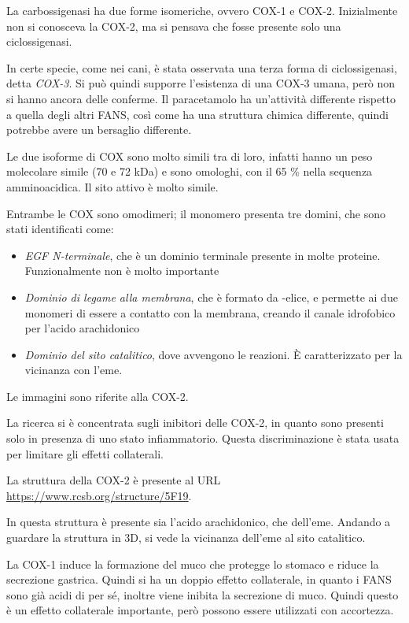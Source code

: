 La carbossigenasi ha due forme isomeriche, ovvero COX-1 e COX-2.
Inizialmente non si conosceva la COX-2, ma si pensava che fosse presente
solo una ciclossigenasi.

In certe specie, come nei cani, è stata osservata una terza forma di
ciclossigenasi, detta \emph{COX-3}. Si può quindi supporre l'esistenza
di una COX-3 umana, però non si hanno ancora delle conferme. Il
paracetamolo ha un'attività differente rispetto a quella degli altri
FANS, così come ha una struttura chimica differente, quindi potrebbe
avere un bersaglio differente.

Le due isoforme di COX sono molto simili tra di loro, infatti hanno un
peso molecolare simile (70 e 72 kDa) e sono omologhi, con il 65 \% nella
sequenza amminoacidica. Il sito attivo è molto simile.

Entrambe le COX sono omodimeri; il monomero presenta tre domini, che
sono stati identificati come:
\begin{itemize}
\item
\emph{EGF N-terminale}, che è un dominio
terminale presente in molte proteine. Funzionalmente non è molto importante
\item
\emph{Dominio di legame alla membrana}, che è formato da \alpha-elice, e permette ai due monomeri di essere a contatto con la membrana, creando il canale idrofobico per l'acido arachidonico
\item
\emph{Dominio del sito catalitico}, dove avvengono le reazioni. È caratterizzato per la vicinanza con l'eme.
\end{itemize}


Le immagini sono riferite alla COX-2.

La ricerca si è concentrata sugli inibitori delle COX-2, in quanto sono
presenti solo in presenza di uno stato infiammatorio. Questa
discriminazione è stata usata per limitare gli effetti collaterali.

La struttura della COX-2 è presente al URL
\url{https://www.rcsb.org/structure/5F19}.

In questa struttura è presente sia l'acido arachidonico, che dell'eme.
Andando a guardare la struttura in 3D, si vede la vicinanza dell'eme al
sito catalitico.

La COX-1 induce la formazione del muco che protegge lo stomaco e riduce
la secrezione gastrica. Quindi si ha un doppio effetto collaterale, in
quanto i FANS sono già acidi di per sé, inoltre viene inibita la
secrezione di muco. Quindi questo è un effetto collaterale importante,
però possono essere utilizzati con accortezza.

